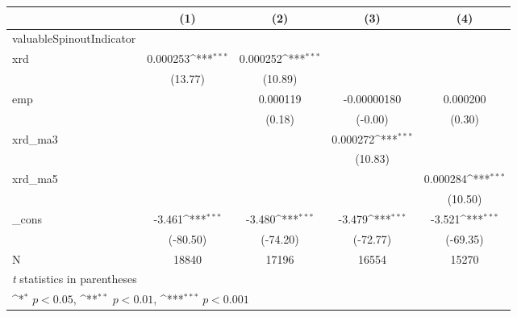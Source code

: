 {
\def\sym#1{\ifmmode^{#1}\else\(^{#1}\)\fi}
\begin{tabular}{l*{4}{c}}
\hline\hline
            &\multicolumn{1}{c}{(1)}         &\multicolumn{1}{c}{(2)}         &\multicolumn{1}{c}{(3)}         &\multicolumn{1}{c}{(4)}         \\
\hline
valuableSpinoutIndicator&                     &                     &                     &                     \\
xrd         &    0.000253\sym{***}&    0.000252\sym{***}&                     &                     \\
            &     (13.77)         &     (10.89)         &                     &                     \\
[1em]
emp         &                     &    0.000119         & -0.00000180         &    0.000200         \\
            &                     &      (0.18)         &     (-0.00)         &      (0.30)         \\
[1em]
xrd\_ma3     &                     &                     &    0.000272\sym{***}&                     \\
            &                     &                     &     (10.83)         &                     \\
[1em]
xrd\_ma5     &                     &                     &                     &    0.000284\sym{***}\\
            &                     &                     &                     &     (10.50)         \\
[1em]
\_cons      &      -3.461\sym{***}&      -3.480\sym{***}&      -3.479\sym{***}&      -3.521\sym{***}\\
            &    (-80.50)         &    (-74.20)         &    (-72.77)         &    (-69.35)         \\
\hline
N           &       18840         &       17196         &       16554         &       15270         \\
\hline\hline
\multicolumn{5}{l}{\footnotesize \textit{t} statistics in parentheses}\\
\multicolumn{5}{l}{\footnotesize \sym{*} \(p<0.05\), \sym{**} \(p<0.01\), \sym{***} \(p<0.001\)}\\
\end{tabular}
}
